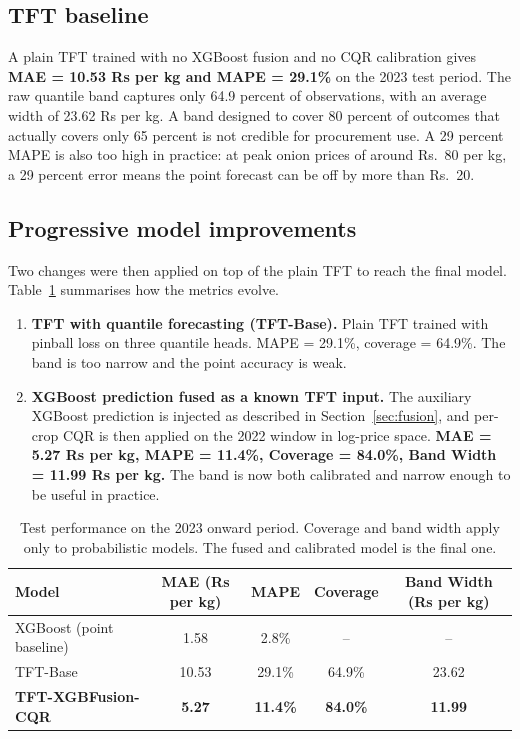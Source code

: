 \documentclass[conference,twoside]{IEEEtran}
\begin{document}
\subsection{TFT baseline}
A plain TFT trained with no XGBoost fusion and no CQR calibration gives \textbf{MAE = 10.53 Rs per kg and MAPE = 29.1\%} on the 2023 test period. The raw quantile band captures only 64.9 percent of observations, with an average width of 23.62 Rs per kg. A band designed to cover 80 percent of outcomes that actually covers only 65 percent is not credible for procurement use. A 29 percent MAPE is also too high in practice: at peak onion prices of around Rs.\ 80 per kg, a 29 percent error means the point forecast can be off by more than Rs.\ 20.

\subsection{Progressive model improvements}
Two changes were then applied on top of the plain TFT to reach the final model. Table~\ref{tab:overall} summarises how the metrics evolve.

\begin{enumerate}
\item \textbf{TFT with quantile forecasting (TFT-Base).} Plain TFT trained with pinball loss on three quantile heads. MAPE = 29.1\%, coverage = 64.9\%. The band is too narrow and the point accuracy is weak.

\item \textbf{XGBoost prediction fused as a known TFT input.} The auxiliary XGBoost prediction is injected as described in Section~\ref{sec:fusion}, and per-crop CQR is then applied on the 2022 window in log-price space. \textbf{MAE = 5.27 Rs per kg, MAPE = 11.4\%, Coverage = 84.0\%, Band Width = 11.99 Rs per kg.} The band is now both calibrated and narrow enough to be useful in practice.
\end{enumerate}

\begin{table}[!t]
\centering
\caption{Test performance on the 2023 onward period. Coverage and band width apply only to probabilistic models. The fused and calibrated model is the final one.}
\label{tab:overall}
\begin{tabular}{lcccc}
\toprule
\textbf{Model} & \textbf{MAE (Rs per kg)} & \textbf{MAPE} & \textbf{Coverage} & \textbf{Band Width (Rs per kg)} \\
\midrule
XGBoost (point baseline)            & 1.58           & 2.8\%           & --     & --     \\
TFT-Base                            & 10.53          & 29.1\%          & 64.9\% & 23.62  \\
\textbf{TFT-XGBFusion-CQR}          & \textbf{5.27}  & \textbf{11.4\%} & \textbf{84.0\%} & \textbf{11.99} \\
\bottomrule
\end{tabular}
\end{table}
\end{document}
